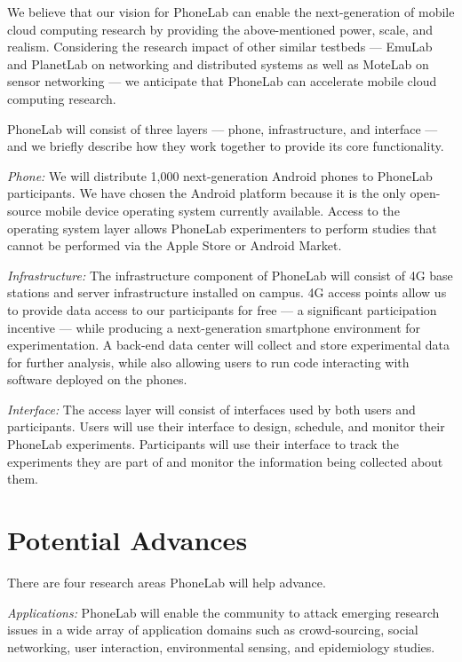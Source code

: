We believe that our vision for PhoneLab can enable the next-generation of mobile cloud computing research by providing the above-mentioned power, scale, and realism. Considering the research impact of other similar testbeds --- EmuLab and PlanetLab on networking and distributed systems as well as MoteLab on sensor networking --- we anticipate that PhoneLab can accelerate mobile cloud computing research.

PhoneLab will consist of three layers --- phone, infrastructure, and
interface --- and we briefly describe how they work together to provide its
core functionality.

\emph{Phone:} We will distribute 1,000 next-generation Android
phones to PhoneLab participants. We have chosen the Android platform
because it is the only open-source mobile device operating system
currently available.  Access to the operating system layer allows
PhoneLab experimenters to perform studies that cannot be performed via
the Apple Store or Android Market.

\emph{Infrastructure:} The infrastructure component of
PhoneLab will consist of 4G base stations and server infrastructure installed
on campus. 4G access points allow us to provide data access to our
participants for free --- a significant participation incentive --- while
producing a next-generation smartphone environment for experimentation. A
back-end data center will collect and store experimental data for further
analysis, while also allowing users to run code interacting with software
deployed on the phones.

\emph{Interface:} The access layer will consist of interfaces used
by both users and participants. Users will use their interface to design,
schedule, and monitor their PhoneLab experiments. Participants will use
their interface to track the experiments they are part of and monitor the
information being collected about them.



\section{Potential Advances} There are four research areas
PhoneLab will help advance. 
 

\emph{Applications:} PhoneLab will enable the community to attack emerging research issues in a wide array of application domains such as crowd-sourcing, social networking, user interaction, environmental sensing, and epidemiology studies. 

